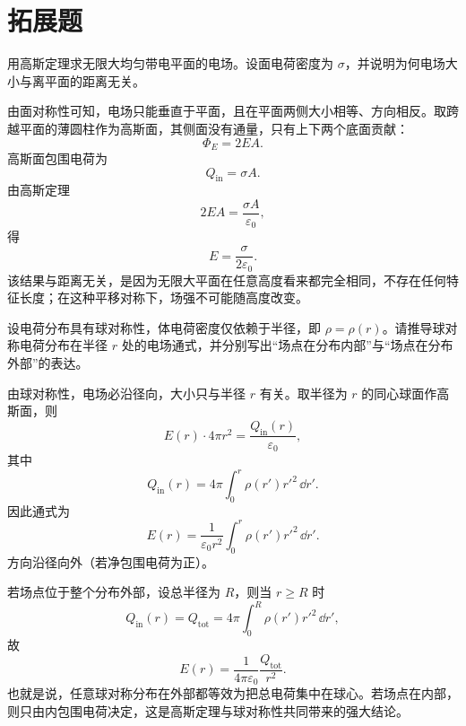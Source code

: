\section{拓展题}

\begin{problem}
用高斯定理求无限大均匀带电平面的电场。设面电荷密度为 $\sigma$，并说明为何电场大小与离平面的距离无关。
\begin{solution}
由面对称性可知，电场只能垂直于平面，且在平面两侧大小相等、方向相反。取跨越平面的薄圆柱作为高斯面，其侧面没有通量，只有上下两个底面贡献：
\[
\Phi_E=2EA.
\]
高斯面包围电荷为
\[
Q_{\text{in}}=\sigma A.
\]
由高斯定理
\[
2EA=\frac{\sigma A}{\varepsilon_0},
\]
得
\[
E=\frac{\sigma}{2\varepsilon_0}.
\]
该结果与距离无关，是因为无限大平面在任意高度看来都完全相同，不存在任何特征长度；在这种平移对称下，场强不可能随高度改变。
\end{solution}
\end{problem}

\begin{problem}
设电荷分布具有球对称性，体电荷密度仅依赖于半径，即 $\rho=\rho(r)$。请推导球对称电荷分布在半径 $r$ 处的电场通式，并分别写出“场点在分布内部”与“场点在分布外部”的表达。
\begin{solution}
由球对称性，电场必沿径向，大小只与半径 $r$ 有关。取半径为 $r$ 的同心球面作高斯面，则
\[
E(r)\cdot 4\pi r^2=\frac{Q_{\text{in}}(r)}{\varepsilon_0},
\]
其中
\[
Q_{\text{in}}(r)=4\pi\int_0^r \rho(r')r'^2\,\dd r'.
\]
因此通式为
\[
E(r)=\frac{1}{\varepsilon_0 r^2}\int_0^r \rho(r')r'^2\,\dd r'.
\]
方向沿径向外（若净包围电荷为正）。

若场点位于整个分布外部，设总半径为 $R$，则当 $r\ge R$ 时
\[
Q_{\text{in}}(r)=Q_{\text{tot}}=4\pi\int_0^R \rho(r')r'^2\,\dd r',
\]
故
\[
E(r)=\frac{1}{4\pi\varepsilon_0}\frac{Q_{\text{tot}}}{r^2}.
\]
也就是说，任意球对称分布在外部都等效为把总电荷集中在球心。若场点在内部，则只由内包围电荷决定，这是高斯定理与球对称性共同带来的强大结论。
\end{solution}
\end{problem}
